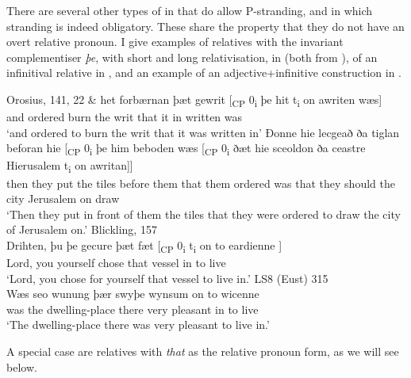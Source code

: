 \documentclass[output=paper]{langsci/langscibook}
\begin{document}
There are several other types of  in 
that do allow P-stranding, and in which stranding is indeed obligatory. These
share the property that they do not have an overt relative pronoun. I give
examples of relatives with the invariant complementiser \textit{þe}, with short
and long relativisation, in  (both from
\citealt[147--148]{vanKemenade1987}), of an infinitival relative in
, and an example of an adjective+infinitive construction in
.

\ea%
    \label{ex:11.3} Orosius, 141, 22 \parencite[147]{vanKemenade1987}
    \ea
	\gll \& het         forbærnan þæt gewrit [\textsubscript{CP} 0\textsubscript{i} þe   hit  t\textsubscript{i} on awriten wæs]\\
		and ordered burn          the   writ {} {}           that it  {}    in written   was\\
	\glt ‘and ordered to burn the writ that it was written in’
	\ex
	\gll Đonne hie lecgeað ða tiglan beforan  hie    [\textsubscript{CP} 0\textsubscript{i} þe    him beboden wæs [\textsubscript{CP} 0\textsubscript{i} ðæt hie sceoldon ða ceastre Hierusalem  t\textsubscript{i} on awritan]]\\
		then    they put     the tiles   before    them  {} {}        that  them ordered was {} {} that they should the city Jerusalem             {} on  draw\\
	\glt ‘Then they put in front of them the tiles that they were ordered to draw the city of Jerusalem on.’
	\z
\ex Blickling, 157 \parencite[151]{vanKemenade1987}\label{ex:11.4}\\
    \gll Drihten, þu   þe           gecure þæt fæt      [\textsubscript{CP} 0\textsubscript{i}     t\textsubscript{i} on to eardienne ]\\
        Lord,      you yourself chose   that vessel  {} {} {}                  in to live\\
    \glt ‘Lord, you chose for yourself that vessel to live in.’
\pagebreak
\ex LS8 (Eust) 315 \parencite[266]{Fischeretal:2000}%
    \label{ex:11.5}\\
    \gll Wæs seo wunung       þær    swyþe wynsum on  to wicenne \\
        was the dwelling-place  there very   pleasant  in  to live\\
    \glt `The dwelling-place there was very pleasant to live in.'
\z

A special case are relatives with \textit{that} as the relative pronoun form,
as we will see below.
\end{document}
